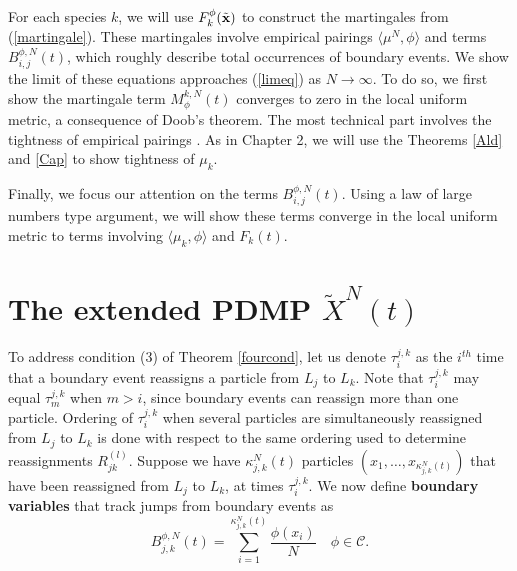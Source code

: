 For each species $k$, we will use $F^\phi_k(\tilde {\textbf x})$ to construct the martingales from (\ref{martingale}). These martingales involve empirical pairings  $\langle \mu^N,\phi\rangle$ and terms $B_{i,j}^{\phi,N}(t)$, which roughly describe total occurrences of boundary events.   We show the limit of these equations approaches (\ref{limeq}) as $N \rightarrow \infty$.  To do so, we first  show the martingale term $M_\phi^{k,N}(t)$ converges to zero in the local uniform metric, a consequence of Doob's theorem. The most technical part  involves the tightness of empirical pairings .  As in Chapter 2, we will use the Theorems \ref{Ald} and \ref{Cap} to show tightness of $\mu_k$.
 
Finally, we focus our attention on the terms $B_{i,j}^{\phi,N}(t)$. Using a law of large numbers type argument, we will show these  terms  converge in the local uniform metric to terms involving $\langle \mu_k, \phi\rangle$ and $F_k(t)$. 











\section{The extended PDMP $\tilde X^{N}(t)$}\label{extension}


 To address condition (3) of Theorem \ref{fourcond}, let us denote $\tau_i^{j,k}$ as the $i^{th}$ time that a boundary event reassigns a particle from $L_j$ to $L_k$. Note that $\tau_i^{j,k}$ may equal $\tau_m^{j,k}$ when $m>i$, since boundary events can reassign more than one particle.  Ordering of $\tau_i^{j,k}$  when several particles are simultaneously reassigned from $L_j$ to $L_k$  is done with respect to the same ordering used to determine reassignments $R_{jk}^{(l)}$.   Suppose we have $\kappa_{j,k}^N(t)$ particles $(x_1, \dots, x_{\kappa_{j,k}^N(t)})$ that have been reassigned from $L_j$ to $L_k$, at times  $\tau_i^{j,k}$. We now define \textbf{boundary variables} that track jumps from boundary events as 
\begin{equation}
B_{j,k}^{\phi,N}(t) = \sum_{i = 1}^{\kappa_{j,k}^N(t)} \frac{\phi(x_i)}{N} \quad \phi \in \mathcal C.
\end{equation}
  

